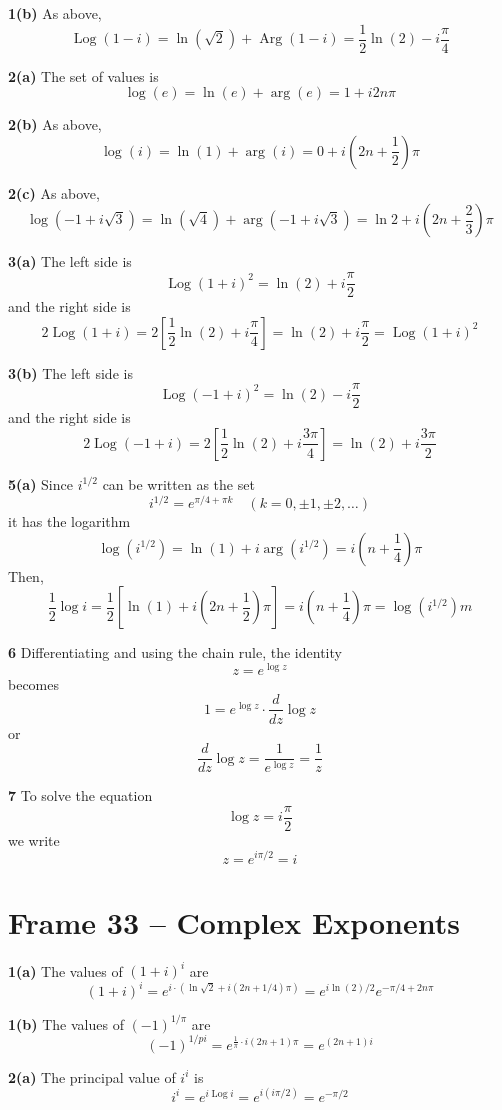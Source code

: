 \documentclass{article}
\DeclareMathOperator{\Log}{Log}
\DeclareMathOperator{\Arg}{Arg}
\begin{document}
\textbf{1(b)}
As above,
\[
	\Log(1 - i) = \ln(\sqrt{2}) + \Arg(1 - i)
	= \frac{1}{2}\ln(2) - i\frac{\pi}{4}
\]

\textbf{2(a)}
The set of values is
\[
	\log(e) = \ln(e) + \arg(e) 
	= 1 + i2n\pi
\]

\textbf{2(b)}
As above,
\[
	\log(i) = \ln(1) + \arg(i)
	= 0 + i\left(2n + \frac{1}{2}\right) \pi
\]

\textbf{2(c)}
As above,
\[
	\log(-1 + i\sqrt{3}) = \ln(\sqrt{4}) + \arg(-1 + i\sqrt{3})
	= \ln 2 + i\left(2n + \frac{2}{3}\right) \pi
\]

\textbf{3(a)}
The left side is
\[
	\Log(1 + i)^2 = \ln(2) + i \frac{\pi}{2}
\]
and the right side is
\[
	2\Log(1 + i) = 2 \left[ \frac{1}{2} \ln(2) + i\frac{\pi}{4} \right]
	= \ln(2) + i\frac{\pi}{2}
	= \Log(1 + i)^2
\]

\textbf{3(b)}
The left side is
\[
	\Log(-1 + i)^2 = \ln(2) - i \frac{\pi}{2}
\]
and the right side is
\[
	2 \Log(-1 + i) = 2 \left[ \frac{1}{2} \ln(2) + i\frac{3\pi}{4} \right]
	= \ln(2) + i\frac{3\pi}{2}
\]

\textbf{5(a)}
Since $i^{1/2}$ can be written as the set
\[
	i^{1/2} = e^{\pi/4 + \pi k}		\quad (k = 0, \pm 1, \pm 2, \dots)
\]
it has the logarithm
\[
	\log(i^{1/2}) = \ln(1) + i \arg(i^{1/2})
	= i \left( n + \frac{1}{4} \right) \pi
\]
Then,
\[
	\frac{1}{2} \log i
	= \frac{1}{2} \left[ \ln(1) + i\left(2n + \frac{1}{2}\right)\pi \right]
	= i\left( n + \frac{1}{4} \right) \pi
	= \log(i^{1/2})m
\]

\textbf{6}
Differentiating and using the chain rule, the identity
\[
	z = e^{\log z}
\]
becomes
\[
	1 = e^{\log z} \cdot \frac{d}{dz} \log z
\]
or
\[
	\frac{d}{dz} \log z = \frac{1}{e^{\log z}} = \frac{1}{z}
\]

\textbf{7}
To solve the equation
\[
	\log z = i\frac{\pi}{2}
\]
we write
\[
	z = e^{i \pi/2} = i
\]


\clearpage
\section{Frame 33 -- Complex Exponents}
\textbf{1(a)}
The values of $(1 + i)^i$ are
\[
	(1 + i)^i
	= e^{i \cdot (\ln \sqrt{2} + i(2n + 1/4)\pi)}
	= e^{i \ln (2) / 2} e^{-\pi/4 + 2n\pi}
\]

\textbf{1(b)}
The values of $(-1)^{1/\pi}$ are
\[
	(-1)^{1/pi}
	= e^{\frac{1}{\pi} \cdot i(2n + 1)\pi}
	= e^{(2n + 1)i}
\]

\textbf{2(a)}
The principal value of $i^i$ is
\[
	i^i
	= e^{i \Log i}
	= e^{i (i \pi/2)}
	= e^{-\pi / 2}
\]
\end{document}
